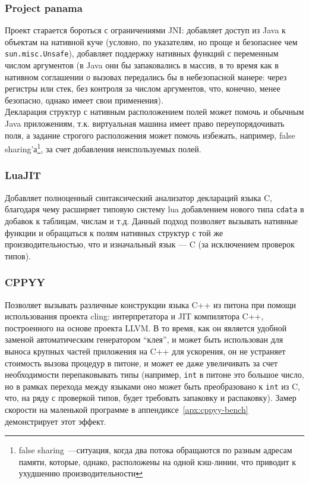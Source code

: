 \documentclass[times,specification,annotation]{itmo-student-thesis}
\begin{document}
\subsubsection{Project panama}
Проект старается бороться с ограничениями JNI: добавляет доступ из Java к объектам на нативной куче (условно, по указателям, но проще и безопаснее чем \texttt{sun.misc.Unsafe}), добавляет поддержку нативных функций с переменным числом аргументов (в Java они бы запаковались в массив, в то время как в нативном соглашении о вызовах передались бы в небезопасной манере: через регистры или стек, без контроля за числом аргументов, что, конечно, менее безопасно, однако имеет свои применения).\\
Декларация структур с нативным расположением полей может помочь и обычным Java приложениям, т.к. виртуальная машина имеет право переупорядочивать поля, а задание строгого расположения может помочь избежать, например, false sharing'а\footnote{false sharing~---ситуация, когда два потока обращаются по разным адресам памяти, которые, однако, расположены на одной кэш-линии, что приводит к ухудшению производительности}, за счет добавления неиспользуемых полей.
\subsubsection{LuaJIT}
Добавляет полноценный синтаксический анализатор деклараций языка C, благодаря чему расширяет типовую систему lua добавлением нового типа \texttt{cdata} в добавок к таблицам, числам и т.д. Данный подход позволяет вызывать нативные функции и обращаться к полям нативных структур с той же производительностью, что и изначальный язык --- C (за исключением проверок типов).
\subsubsection{CPPYY}
Позволяет вызывать различные конструкции языка C++ из питона при помощи использования проекта cling: интерпретатора и JIT компилятора C++, построенного на основе проекта LLVM. В то время, как он является удобной заменой автоматическим генератором ``клея'', и может быть использован для выноса крупных частей приложения на C++ для ускорения, он не устраняет стоимость вызова процедур в питоне, и может ее даже увеличивать за счет необходимости перепаковывать типы (например, \texttt{int} в питоне это большое число, но в рамках перехода между языками оно может быть преобразовано к \texttt{int} из C, что, на ряду с проверкой типов, будет требовать запаковку и распаковку). Замер скорости на маленькой программе в аппендиксе~\ref{apx:cppyy-bench} демонстрирует этот эффект.
\end{document}
